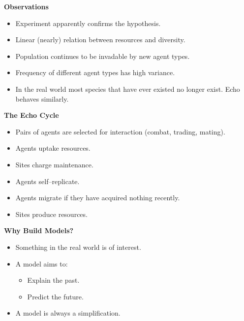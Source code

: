 %
%
\begin{slide}{}
\centerline{\bf Observations}
\begin{itemize}
\item Experiment apparently confirms the hypothesis.
\item Linear (nearly) relation between resources and diversity.
\item Population continues to be invadable by new agent types.
\item Frequency of different agent types has high variance.
\item In the real world most species that have ever existed no longer exist.
Echo behaves similarly.
\end{itemize}

\end{slide}


%
%
\begin{slide}{}
\centerline{\bf The Echo Cycle}
\begin{itemize}
\vskip 15pt
\itemsep 0pt
\parsep  0pt
\parskip 0pt
\item Pairs of agents are selected for interaction (combat, trading, mating).
\vskip 6pt
\item Agents uptake resources.
\vskip 6pt
\item Sites charge maintenance.
\vskip 6pt
\item Agents self--replicate.
\vskip 6pt
\item Agents migrate if they have acquired nothing recently.
\vskip 6pt
\item Sites produce resources.
\end{itemize}
\end{slide}

%
%
\begin{slide}{}
\centerline{\bf Why Build Models?}
\begin{itemize}
\vskip 15pt
\itemsep 0pt
\parsep  0pt
\parskip 0pt
\item Something in the real world is of interest.
\vskip 6pt
\item A model aims to:
\begin{itemize}
\item Explain the past.
\vskip 3pt
\item Predict the future.
\end{itemize}
\vskip 6pt
\item A model is always a simplification.
\end{itemize}
\end{slide}

